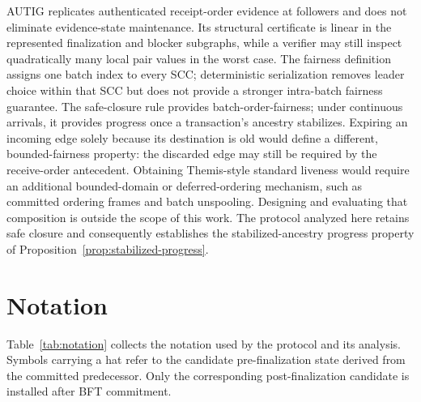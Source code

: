 AUTIG replicates authenticated receipt-order evidence at followers and does
not eliminate evidence-state maintenance.  Its structural certificate is
linear in the represented finalization and blocker subgraphs, while a verifier
may still inspect quadratically many local pair values in the worst case.  The
fairness definition assigns one batch index to every SCC; deterministic
serialization removes leader choice within that SCC but does not provide a
stronger intra-batch fairness guarantee.  The safe-closure rule provides
batch-order-fairness; under continuous arrivals, it provides progress once a
transaction's ancestry stabilizes.  Expiring an incoming edge solely because
its destination is old would define a different, bounded-fairness property: the
discarded edge may still be required by the receive-order antecedent.
Obtaining Themis-style standard liveness would require an additional
bounded-domain or deferred-ordering mechanism, such as committed ordering
frames and batch unspooling.  Designing and evaluating that composition is
outside the scope of this work.  The protocol analyzed here retains safe closure
and consequently establishes the stabilized-ancestry progress property of
Proposition~\ref{prop:stabilized-progress}.

\appendices
\section{Notation}
\label{app:notation}

Table~\ref{tab:notation} collects the notation used by the protocol and its
analysis.  Symbols carrying a hat refer to the candidate pre-finalization
state derived from the committed predecessor.  Only the corresponding
post-finalization candidate is installed after BFT commitment.

